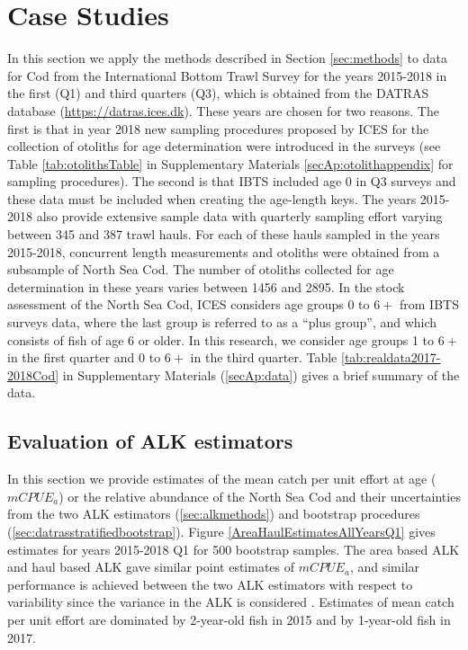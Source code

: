 \documentclass[a4paper 12pt]{article}
\numberwithin{equation}{section}
\begin{document}
\section{Case Studies}
\label{sec:data}
In this section we apply the methods described in Section \ref{sec:methods} to data for Cod from the International Bottom Trawl Survey for the years 2015-2018 in the first (Q1) and third quarters (Q3), which is obtained from the DATRAS database (\href{https://datras.ices.dk}{https://datras.ices.dk}). These years are chosen for two reasons. The first is that in year 2018 new sampling procedures proposed by ICES for the collection of otoliths for age determination were introduced in the surveys (see Table \ref{tab:otolithsTable} in Supplementary Materials \ref{secAp:otolithappendix} for sampling procedures). The second is that IBTS included age 0 in Q3 surveys and these data must be included when creating the age-length keys. The years 2015-2018 also provide extensive sample data with quarterly sampling effort varying between 345 and 387 trawl hauls.  For each of these hauls sampled in the years 2015-2018, concurrent length measurements and otoliths were obtained from a subsample of North Sea Cod. The number of otoliths collected for age determination in these years varies between 1456 and 2895.  In the stock assessment of the North Sea Cod,  ICES considers age groups 0 to $6+$ from IBTS surveys data, where the last group is referred to as a ``plus group'', and which consists of fish of age 6 or older.  In this research, we consider age groups 1 to $6+$ in the first quarter and 0 to $6+$ in the third quarter. Table \ref{tab:realdata2017-2018Cod} in Supplementary Materials (\ref{secAp:data}) gives a brief summary of the data.

\subsection{Evaluation of ALK estimators}
\label{sec:EstimatesALK}
In this section we provide estimates of the mean catch per unit effort at age ($mCPUE_{a}$) or the relative abundance of the North Sea Cod  and their uncertainties from the two ALK estimators (\ref{sec:alkmethods}) and bootstrap procedures (\ref{sec:datrasstratifiedbootstrap}). Figure \ref{AreaHaulEstimatesAllYearsQ1} gives estimates for years 2015-2018 Q1 for 500 bootstrap samples. The area based ALK and haul based ALK gave similar point estimates of $mCPUE_{a}$, and similar performance is achieved between the two ALK estimators with respect to variability since the variance in the ALK is considered \citep{aanes2015efficient}. Estimates of mean catch per unit effort are dominated by  2-year-old fish in 2015 and by 1-year-old fish in 2017.
\end{document}
